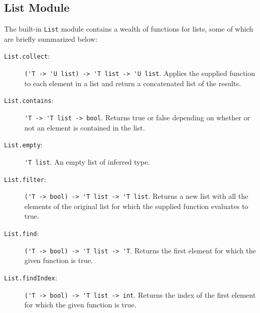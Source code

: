 \subsection{List Module}
The built-in \lstinline{List} module contains a wealth of functions for lists, some of which are
briefly summarized below:
\begin{description}
\item[\texttt{List.collect}:] \lstinline{('T -> 'U list) -> 'T list -> 'U list}. Applies the supplied function to each element in a list and return a concatenated list of the results.
\item[\texttt{List.contains}:] \lstinline{'T -> 'T list -> bool}. Returns true or false depending on whether or not an element is contained in the list.
\item[\texttt{List.empty}:]  \lstinline{'T list}. An empty list of inferred type.
\item[\texttt{List.filter}:] \lstinline{('T -> bool) -> 'T list -> 'T list}. Returns a new list with all the elements of the original list for which the supplied function evaluates to true.
\item[\texttt{List.find}:] \lstinline{('T -> bool) -> 'T list -> 'T}. Returns the first element for which the given function is true.
\item[\texttt{List.findIndex}:] \lstinline{('T -> bool) -> 'T list -> int}. Returns the index of the first element for which the given function is true.

\end{description}
